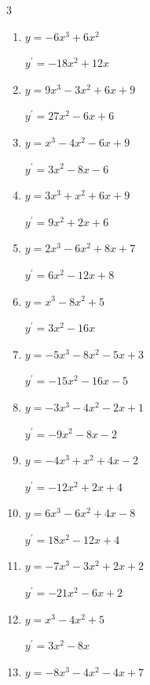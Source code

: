 \begin{multicols}{3}
\begin{enumerate}
        $\displaystyle y^{\prime}=27x^{2}-10x-1$

  \item $y=-6x^{3}+6x^{2}$

        $\displaystyle y^{\prime}=-18x^{2}+12x$

\columnbreak %

  \item $y=9x^{3}-3x^{2}+6x+9$

        $\displaystyle y^{\prime}=27x^{2}-6x+6$

  \item $y=x^{3}-4x^{2}-6x+9$

        $\displaystyle y^{\prime}=3x^{2}-8x-6$

  \item $y=3x^{3}+x^{2}+6x+9$

        $\displaystyle y^{\prime}=9x^{2}+2x+6$

  \item $y=2x^{3}-6x^{2}+8x+7$

        $\displaystyle y^{\prime}=6x^{2}-12x+8$

  \item $y=x^{3}-8x^{2}+5$

        $\displaystyle y^{\prime}=3x^{2}-16x$

  \item $y=-5x^{3}-8x^{2}-5x+3$

        $\displaystyle y^{\prime}=-15x^{2}-16x-5$

  \item $y=-3x^{3}-4x^{2}-2x+1$

        $\displaystyle y^{\prime}=-9x^{2}-8x-2$

  \item $y=-4x^{3}+x^{2}+4x-2$

        $\displaystyle y^{\prime}=-12x^{2}+2x+4$

  \item $y=6x^{3}-6x^{2}+4x-8$

        $\displaystyle y^{\prime}=18x^{2}-12x+4$

  \item $y=-7x^{3}-3x^{2}+2x+2$

        $\displaystyle y^{\prime}=-21x^{2}-6x+2$

  \item $y=x^{3}-4x^{2}+5$

        $\displaystyle y^{\prime}=3x^{2}-8x$

  \item $y=-8x^{3}-4x^{2}-4x+7$


\end{enumerate}
\end{multicols}
